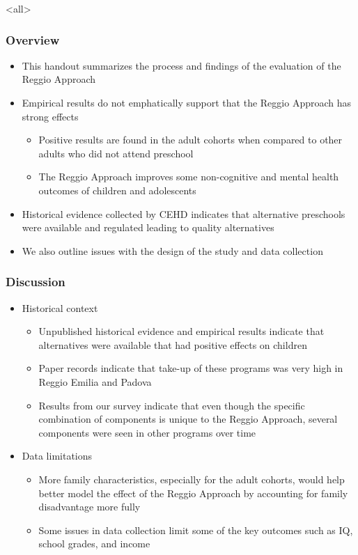 \documentclass[dynamic]{JJH-Beamer}
\begin{document}

\mode<all>{\theTitlePages} %

\begin{frame}
\frametitle{Overview}
\begin{itemize}
\item This handout summarizes the process and findings of the evaluation of the Reggio Approach
\item Empirical results do not emphatically support that the Reggio Approach has strong effects
\begin{itemize}
	\item Positive results are found in the adult cohorts when compared to other adults who did not attend preschool
	\item The Reggio Approach improves some non-cognitive and mental health outcomes of children and adolescents
\end{itemize}
\item Historical evidence collected by CEHD indicates that alternative preschools were available and regulated leading to quality alternatives
\item We also outline issues with the design of the study and data collection 
\end{itemize}

\end{frame}


\begin{frame}
\frametitle{Discussion}
\begin{itemize}
	\item Historical context
	\begin{itemize}
		\item Unpublished historical evidence and empirical results indicate that alternatives were available that had positive effects on children
		\item Paper records indicate that take-up of these programs was very high in Reggio Emilia and Padova
		\item Results from our survey indicate that even though the specific combination of components is unique to the Reggio Approach, several components were seen in other programs over time
	\end{itemize}
	\item Data limitations
	\begin{itemize}
		\item More family characteristics, especially for the adult cohorts, would help better model the effect of the Reggio Approach by accounting for family disadvantage more fully
		\item Some issues in data collection limit some of the key outcomes such as IQ, school grades, and income
	\end{itemize}
\end{itemize}
\end{frame}
\end{document}
